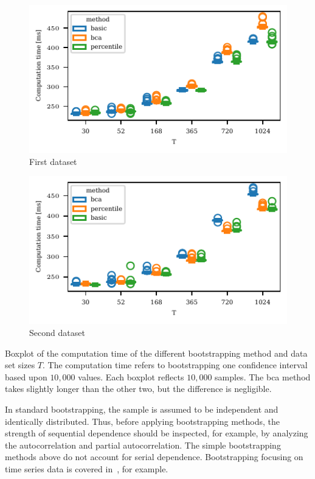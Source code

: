 \begin{table}
    \centering
    \begin{subfigure}{0.48\textwidth}
        \includegraphics{plots/illustrative_examples/boxplot_comp_time_butterfly}
        \caption{First dataset}
    \end{subfigure}
    \begin{subfigure}{0.48\textwidth}
        \includegraphics{plots/illustrative_examples/boxplot_comp_time_normal}
        \caption{Second dataset}
    \end{subfigure}
    \caption{Boxplot of the computation time of the different bootstrapping method and data set sizes $T$. The computation time refers to bootstrapping one confidence interval based upon $10,000$ values. Each boxplot reflects $10,000$ samples. The \ac{bca} method takes slightly longer than the other two, but the difference is negligible.}
    \label{fig:trending_bootstrap_time}
\end{table}



In standard bootstrapping, the sample is assumed to be independent and identically distributed.
Thus, before applying bootstrapping methods, the strength of sequential dependence should be inspected, for example, by analyzing the autocorrelation and partial autocorrelation.
The simple bootstrapping methods above do not account for serial dependence. 
Bootstrapping focusing on time series data is covered in~\textcite{Hardle2003,Kreiss2012}, for example.

